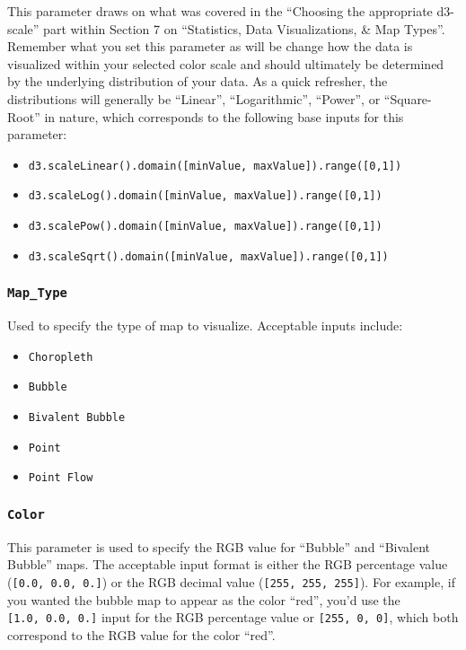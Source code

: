\documentclass[
  12pt,
]{krantz}
\providecommand{\tightlist}{%
  \setlength{\itemsep}{0pt}\setlength{\parskip}{0pt}}
\begin{document}
This parameter draws on what was covered in the ``Choosing the appropriate d3-scale'' part within Section 7 on ``Statistics, Data Visualizations, \& Map Types''. Remember what you set this parameter as will be change how the data is visualized within your selected color scale and should ultimately be determined by the underlying distribution of your data. As a quick refresher, the distributions will generally be ``Linear'', ``Logarithmic'', ``Power'', or ``Square-Root'' in nature, which corresponds to the following base inputs for this parameter:

\begin{itemize}
\tightlist
\item
  \texttt{d3.scaleLinear().domain({[}minValue,\ maxValue{]}).range({[}0,1{]})}
\item
  \texttt{d3.scaleLog().domain({[}minValue,\ maxValue{]}).range({[}0,1{]})}
\item
  \texttt{d3.scalePow().domain({[}minValue,\ maxValue{]}).range({[}0,1{]})}
\item
  \texttt{d3.scaleSqrt().domain({[}minValue,\ maxValue{]}).range({[}0,1{]})}
\end{itemize}

\hypertarget{map_type}{%
\subsubsection*{\texorpdfstring{\texttt{Map\_Type}}{Map\_Type}}\label{map_type}}


Used to specify the type of map to visualize. Acceptable inputs include:

\begin{itemize}
\tightlist
\item
  \texttt{Choropleth}
\item
  \texttt{Bubble}
\item
  \texttt{Bivalent\ Bubble}
\item
  \texttt{Point}
\item
  \texttt{Point\ Flow}
\end{itemize}

\hypertarget{color}{%
\subsubsection*{\texorpdfstring{\texttt{Color}}{Color}}\label{color}}


This parameter is used to specify the RGB value for ``Bubble'' and ``Bivalent Bubble'' maps. The acceptable input format is either the RGB percentage value (\texttt{{[}0.0,\ 0.0,\ 0.{]}}) or the RGB decimal value (\texttt{{[}255,\ 255,\ 255{]}}). For example, if you wanted the bubble map to appear as the color ``red'', you'd use the \texttt{{[}1.0,\ 0.0,\ 0.{]}} input for the RGB percentage value or \texttt{{[}255,\ 0,\ 0{]}}, which both correspond to the RGB value for the color ``red''.
\end{document}
